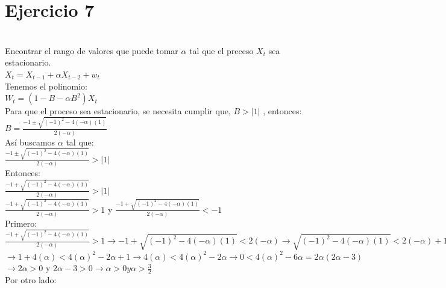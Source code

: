 \documentclass{article}
\begin{document}
\section{Ejercicio 7}\\

Encontrar el rango de valores que puede tomar $\alpha$ tal que el preceso $X_t$ sea estacionario.\\

$ X_t = X_{t-1} + \alpha X_{t-2} + w_t$\\

Tenemos el polinomio: \\

$W_t = (1-B - \alpha B^2) X_t$\\

Para que el proceso sea estacionario, se necesita cumplir que,  $ B >|1|$  , entonces: \\

$B= \frac{-1 \pm \sqrt{(-1)^2 - 4 (-\alpha)(1)}}{2(-\alpha)}$\\

As{í} buscamos $\alpha $ tal que:\\

$\frac{-1 \pm \sqrt{(-1)^2 - 4 (-\alpha)(1)}}{2(-\alpha)} > |1|$ \\

Entonces: \\

$\frac{-1 + \sqrt{(-1)^2 - 4 (-\alpha)(1)}}{2(-\alpha)} > |1|$ \\

$\frac{-1 + \sqrt{(-1)^2 - 4 (-\alpha)(1)}}{2(-\alpha)} > 1$   y  $\frac{-1 + \sqrt{(-1)^2 - 4 (-\alpha)(1)}}{2(-\alpha)} < -1$  \\

Primero:\\

$\frac{-1 + \sqrt{(-1)^2 - 4 (-\alpha)(1)}}{2(-\alpha)} > 1 \rightarrow -1 + \sqrt{(-1)^2 - 4 (-\alpha)(1)} < 2(-\alpha)  \rightarrow \sqrt{(-1)^2 - 4 (-\alpha)(1)} < 2(-\alpha)+1 $\\
$\rightarrow  1 + 4(\alpha) < 4(\alpha)^2-2\alpha +1  \rightarrow  4(\alpha) < 4(\alpha)^2-2\alpha  \rightarrow  0 < 4(\alpha)^2-6\alpha = 2\alpha(2\alpha-3)  $\\

$\rightarrow  2\alpha >0$ y $2\alpha-3 >0  \rightarrow  \alpha >0 y \alpha > \frac{3}{2}$\\

Por otro lado: \\
\end{document}
